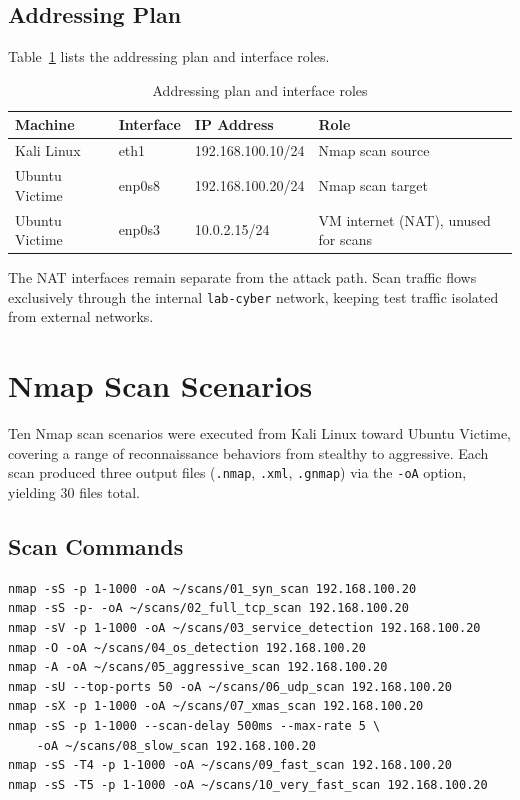 \documentclass[12pt,a4paper]{report}
\begin{document}
\subsection{Addressing Plan}

Table~\ref{tab:adressage} lists the addressing plan and interface roles.

\begin{table}[H]
\centering
\caption{Addressing plan and interface roles}
\label{tab:adressage}
\begin{tabular}{llll}
\toprule
\textbf{Machine} & \textbf{Interface} & \textbf{IP Address} & \textbf{Role} \\
\midrule
Kali Linux & eth1 & 192.168.100.10/24 & Nmap scan source \\
Ubuntu Victime & enp0s8 & 192.168.100.20/24 & Nmap scan target \\
Ubuntu Victime & enp0s3 & 10.0.2.15/24 & VM internet (NAT), unused for scans \\
\bottomrule
\end{tabular}
\end{table}

\noindent The NAT interfaces remain separate from the attack path. Scan traffic flows exclusively through the internal \texttt{lab-cyber} network, keeping test traffic isolated from external networks.

\section{Nmap Scan Scenarios}

Ten Nmap scan scenarios were executed from Kali Linux toward Ubuntu Victime, covering a range of reconnaissance behaviors from stealthy to aggressive. Each scan produced three output files (\texttt{.nmap}, \texttt{.xml}, \texttt{.gnmap}) via the \texttt{-oA} option, yielding 30 files total.

\subsection{Scan Commands}

\begin{lstlisting}[caption={Nmap commands executed from Kali Linux}]
nmap -sS -p 1-1000 -oA ~/scans/01_syn_scan 192.168.100.20
nmap -sS -p- -oA ~/scans/02_full_tcp_scan 192.168.100.20
nmap -sV -p 1-1000 -oA ~/scans/03_service_detection 192.168.100.20
nmap -O -oA ~/scans/04_os_detection 192.168.100.20
nmap -A -oA ~/scans/05_aggressive_scan 192.168.100.20
nmap -sU --top-ports 50 -oA ~/scans/06_udp_scan 192.168.100.20
nmap -sX -p 1-1000 -oA ~/scans/07_xmas_scan 192.168.100.20
nmap -sS -p 1-1000 --scan-delay 500ms --max-rate 5 \
    -oA ~/scans/08_slow_scan 192.168.100.20
nmap -sS -T4 -p 1-1000 -oA ~/scans/09_fast_scan 192.168.100.20
nmap -sS -T5 -p 1-1000 -oA ~/scans/10_very_fast_scan 192.168.100.20
\end{lstlisting}
\end{document}
